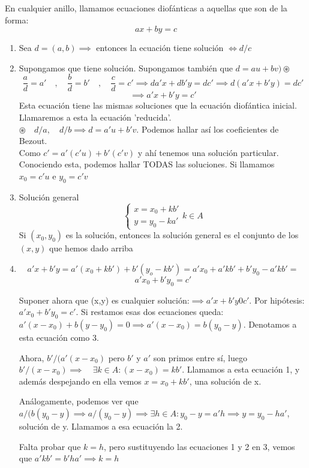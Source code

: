 \documentclass[11pt, a4paper, titlepage]{article}
\makeatletter
\renewenvironment{proof}[1][\proofname] {\vspace{-15pt}\par\pushQED{\qed}\normalfont\topsep6\p@\@plus6\p@\relax\trivlist\item[\hskip\labelsep\it#1\@addpunct{.}]\ignorespaces}{\popQED\endtrivlist\@endpefalse}
\theoremstyle{theorem-style}
\theoremstyle{definition-style}
\theoremstyle{remark-style}
\theoremstyle{example-style}
\newenvironment{nlist}
{\begin{enumerate}
\renewcommand\labelenumi{(\emph{\roman{enumi})}}}
{\end{enumerate}}
\makeatother
\begin{document}
En cualquier anillo, llamamos ecuaciones diofánticas a aquellas que son de la forma:
\[
ax +by  = c
\]
\begin{nlist}
	\item Sea $d=(a,b)\implies$ entonces la ecuación tiene solución $\iff d/c$
	\item Supongamos que tiene solución. Supongamos también que $d= au+bv) \circledast$
\[
\frac{a}{d}= a' \quad,\quad \frac{b}{d}=b'\quad,\quad \frac{c}{d}=c'\implies da'x + db'y = dc' \implies d(a'x+b'y)=dc'\]
\[ \implies a'x+b'y = c'
\]
Esta ecuación tiene las mismas soluciones que la ecuación diofántica inicial. Llamaremos a esta la ecuación 'reducida'.\\
$\circledast\quad d/a ,\quad d/b \implies d=a'u +b 'v $. Podemos hallar así los coeficientes de Bezout.\\

Como $c'= a'(c'u)+b'(c'v)$ y ahí tenemos una solución particular. Conociendo esta, podemos hallar TODAS las soluciones. Si llamamos $x_0 =c'u$ e $y_0 = c'v$

\item Solución general \[\begin{cases}
	x = x_0 +kb'\\
	y= y_0 -ka'
\end{cases} k\in A\]
Si $(x_0,y_0)$ es la solución, entonces la solución general es el conjunto de los $(x,y)$ que hemos dado arriba
\\
\begin{proof}[Demostración de iii)]

\[
a'x + b'y = a'(x_0 +kb') + b'(y_o - kb') = a'x_0 + a'kb' + b'y_0 - a'kb' = 
\]
\[
a'x_0 +b'y_0 = c'
\]

Suponer ahora que (x,y) es cualquier solución:$\implies a'x +b'y 0  c'$. Por hipótesis: $a'x_0 +b'y_0 = c'$. Si restamos esas dos ecuaciones queda: $a'(x-x_0) +b(y-y_0) = 0 \implies a'(x-x_0) = b(y_0-y)$. Denotamos a esta ecuación como 3.

Ahora, $b'/(a'(x-x_0)$ pero $b'$ y $a'$ son primos entre sí, luego $b'/(x-x_0)\implies \quad \exists k \in A : (x-x_0) = kb'$. Llamamos a esta ecuación 1, y además despejando en ella vemos $x = x_0 + kb'$, una solución de x.

Análogamente, podemos ver que $a/(b(y_0-y) \implies a/(y_0-y) \implies \exists h \in A: y_0 -y = a'h \implies y = y_0 - ha'$, solución de y. Llamamos a esa ecuación la 2.

Falta probar que $k = h$, pero sustituyendo las ecuaciones 1 y 2 en 3, vemos que $a'kb'  = b'ha' \implies k = h$
	
\end{proof}

\end{nlist}
\end{document}
